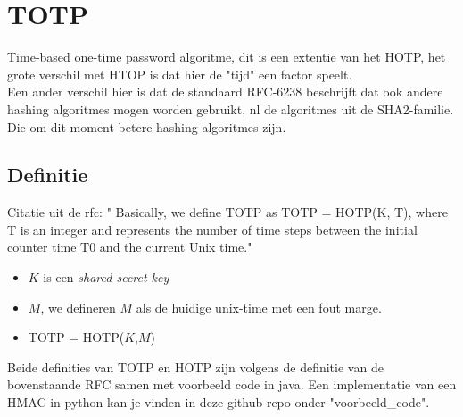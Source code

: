 \documentclass[10pt,a4paper]{report}
\begin{document}
\section*{TOTP}
Time-based one-time password algoritme, dit is een extentie van het HOTP, het grote verschil met HTOP is dat hier de "tijd" een factor speelt.\\

Een ander verschil hier is dat de standaard RFC-6238 beschrijft dat ook andere hashing algoritmes mogen worden gebruikt, nl de algoritmes uit de SHA2-familie. Die om dit moment betere hashing algoritmes zijn.
\subsection*{Definitie}
Citatie uit de rfc: " 
Basically, we define TOTP as TOTP = HOTP(K, T), where T is an integer
and represents the number of time steps between the initial counter
time T0 and the current Unix time."
\begin{itemize}
\item $K$ is een \emph{shared secret key}
\item $M$, we defineren $M$ als de huidige unix-time met een fout marge.
\item TOTP = HOTP($K$,$M$)
\end{itemize}
Beide definities van TOTP en HOTP zijn volgens de definitie van de bovenstaande RFC samen met voorbeeld code in java. Een implementatie van een HMAC in python kan je vinden in deze github repo onder "voorbeeld_code".
\end{document}
